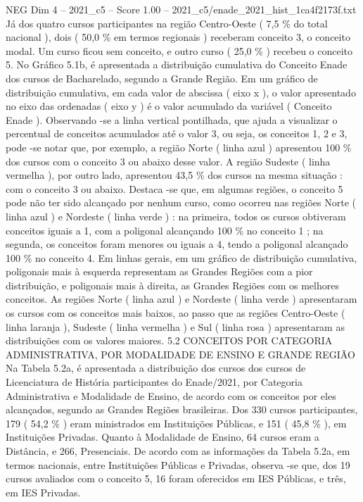 \begin{textsample}{NEG Dim 4 – 2021\_c5 – Score 1.00 – 2021\_c5/enade\_2021\_hist\_1ca4f2173f.txt}
Já dos quatro cursos participantes na região Centro-Oeste ( 7,5 \% do total nacional ), dois ( 50,0 \% em termos regionais ) receberam conceito 3, o conceito modal.
Um curso ficou sem conceito, e outro curso ( 25,0 \% ) recebeu o conceito 5.
No Gráfico 5.1b, é apresentada a distribuição cumulativa do Conceito Enade dos cursos de Bacharelado, segundo a Grande Região.
Em um gráfico de distribuição cumulativa, em cada valor de abscissa ( eixo x ), o valor apresentado no eixo das ordenadas ( eixo y ) é o valor acumulado da variável ( Conceito Enade ).
Observando -se a linha vertical pontilhada, que ajuda a visualizar o percentual de conceitos acumulados até o valor 3, ou seja, os conceitos 1, 2 e 3, pode -se notar que, por exemplo, a região Norte ( linha azul ) apresentou 100 \% dos cursos com o conceito 3 ou abaixo desse valor.
A região Sudeste ( linha vermelha ), por outro lado, apresentou 43,5 \% dos cursos na mesma situação : com o conceito 3 ou abaixo.
Destaca -se que, em algumas regiões, o conceito 5 pode não ter sido alcançado por nenhum curso, como ocorreu nas regiões Norte ( linha azul ) e Nordeste ( linha verde ) : na primeira, todos os cursos obtiveram conceitos iguais a 1, com a poligonal alcançando 100 \% no conceito 1 ; na segunda, os conceitos foram menores ou iguais a 4, tendo a poligonal alcançado 100 \% no conceito 4.
Em linhas gerais, em um gráfico de distribuição cumulativa, poligonais mais à esquerda representam as Grandes Regiões com a pior distribuição, e poligonais mais à direita, as Grandes Regiões com os melhores conceitos.
As regiões Norte ( linha azul ) e Nordeste ( linha verde ) apresentaram os cursos com os conceitos mais baixos, ao passo que as regiões Centro-Oeste ( linha laranja ), Sudeste ( linha vermelha ) e Sul ( linha rosa ) apresentaram as distribuições com os valores maiores. 5.2 CONCEITOS POR CATEGORIA ADMINISTRATIVA, POR MODALIDADE DE ENSINO E GRANDE REGIÃO Na Tabela 5.2a, é apresentada a distribuição dos cursos dos cursos de Licenciatura de História participantes do Enade/2021, por Categoria Administrativa e Modalidade de Ensino, de acordo com os conceitos por eles alcançados, segundo as Grandes Regiões brasileiras.
Dos 330 cursos participantes, 179 ( 54,2 \% ) eram ministrados em Instituições Públicas, e 151 ( 45,8 \% ), em Instituições Privadas.
Quanto à Modalidade de Ensino, 64 cursos eram a Distância, e 266, Presenciais.
De acordo com as informações da Tabela 5.2a, em termos nacionais, entre Instituições Públicas e Privadas, observa -se que, dos 19 cursos avaliados com o conceito 5, 16 foram oferecidos em IES Públicas, e três, em IES Privadas.

\end{textsample}
